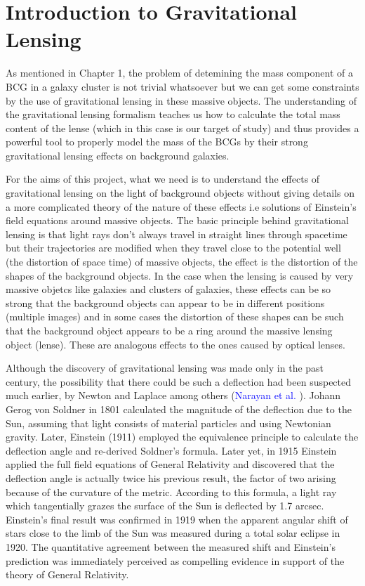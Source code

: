 \chapter{Introduction to Gravitational Lensing}

As mentioned in Chapter 1, the problem of detemining the mass component of a BCG in a galaxy cluster is not trivial whatsoever but we can get some constraints by the use of gravitational lensing in these massive objects. The understanding of the gravitational lensing formalism teaches us how to calculate the total mass content of the lense (which in this case is our target of study) and thus provides a powerful tool to properly model the mass of the BCGs by their strong gravitational lensing effects on background galaxies. 

For the aims of this project, what we need is to understand the effects of gravitational lensing on the light of background objects without giving details on a more complicated theory of the nature of these effects i.e solutions of Einstein's field equations around massive objects. The basic principle behind gravitational lensing is that light rays don't always travel in straight lines through spacetime but their trajectories are modified when they travel close to the potential well (the distortion of space time) of massive objects, the effect is the distortion of the shapes of the background objects. In the case when the lensing is caused by very massive objetcs like galaxies and clusters of galaxies, these effects can be so strong that the background objects can appear to be in different positions (multiple images) and in some cases the distortion of these shapes can be such that the background object appears to be a ring around the massive lensing object (lense). These are analogous effects to the ones caused by optical lenses. 

Although the discovery of gravitational lensing was made only in the past century, the possibility that there could be such a deflection had been suspected much earlier, by Newton and Laplace among others (\textcolor{blue}{Narayan et al.} \citeyear{Reference25}). Johann Gerog von Soldner in 1801 calculated the magnitude of the deflection due to the Sun, assuming that light consists of material particles and using Newtonian gravity. Later, Einstein (1911) employed the equivalence principle to calculate the deflection angle and re-derived Soldner’s formula. Later yet, in 1915 Einstein applied the full field equations of General Relativity and discovered that the deflection angle is actually twice his previous result, the factor of two arising because of the curvature of the metric. According to this formula, a light ray which tangentially grazes the surface of the Sun is deflected by 1.7 arcsec. Einstein’s final result was confirmed in 1919 when the apparent angular shift of stars close to the limb of the Sun was measured during a total solar eclipse in 1920. The quantitative agreement between the measured shift and Einstein’s prediction was immediately perceived as compelling evidence in support of the theory of General Relativity.

